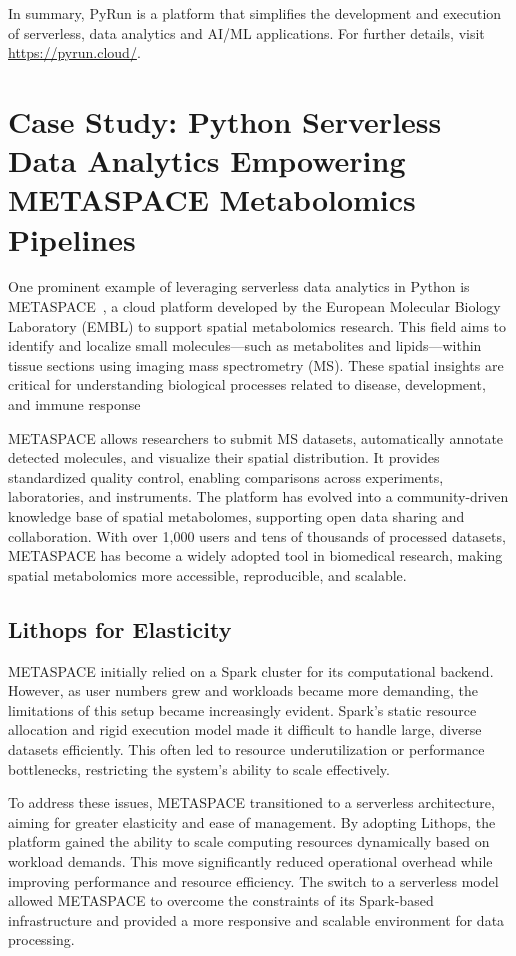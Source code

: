 In summary, PyRun is a platform that simplifies the development and execution of serverless, data analytics and AI/ML applications. For further details, visit \url{https://pyrun.cloud/}.


\section{Case Study: Python Serverless Data Analytics Empowering METASPACE Metabolomics Pipelines}

One prominent example of leveraging serverless data analytics in Python is METASPACE~\citep{metaspace}, a cloud platform developed by the European Molecular Biology Laboratory (EMBL) to support spatial metabolomics research. This field aims to identify and localize small molecules—such as metabolites and lipids—within tissue sections using imaging mass spectrometry (MS). These spatial insights are critical for understanding biological processes related to disease, development, and immune response

METASPACE allows researchers to submit MS datasets, automatically annotate detected molecules, and visualize their spatial distribution. It provides standardized quality control, enabling comparisons across experiments, laboratories, and instruments. The platform has evolved into a community-driven knowledge base of spatial metabolomes, supporting open data sharing and collaboration. With over 1,000 users and tens of thousands of processed datasets, METASPACE has become a widely adopted tool in biomedical research, making spatial metabolomics more accessible, reproducible, and scalable.

\subsection{Lithops for Elasticity}

METASPACE initially relied on a Spark cluster for its computational backend. However, as user numbers grew and workloads became more demanding, the limitations of this setup became increasingly evident. Spark’s static resource allocation and rigid execution model made it difficult to handle large, diverse datasets efficiently. This often led to resource underutilization or performance bottlenecks, restricting the system’s ability to scale effectively.

To address these issues, METASPACE transitioned to a serverless architecture, aiming for greater elasticity and ease of management. By adopting Lithops, the platform gained the ability to scale computing resources dynamically based on workload demands. This move significantly reduced operational overhead while improving performance and resource efficiency. The switch to a serverless model allowed METASPACE to overcome the constraints of its Spark-based infrastructure and provided a more responsive and scalable environment for data processing.

